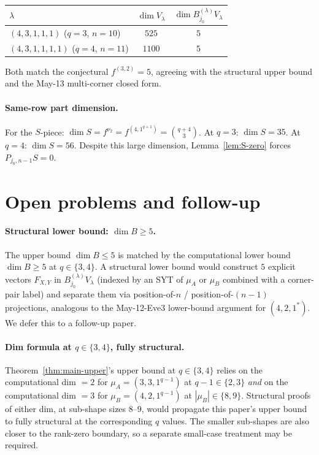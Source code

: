 \documentclass[11pt]{article}
\theoremstyle{definition}
\begin{document}
\begin{center}
\begin{tabular}{lcc}
\toprule
$\lambda$ & $\dim V_\lambda$ & $\dim B^{(\lambda)}_{j_0} V_\lambda$ \\
\midrule
$(4, 3, 1, 1, 1)$ \quad ($q = 3$, $n = 10$) & $525$ & $5$ \\
$(4, 3, 1, 1, 1, 1)$ \quad ($q = 4$, $n = 11$) & $1100$ & $5$ \\
\bottomrule
\end{tabular}
\end{center}

Both match the conjectural $f^{(3, 2)} = 5$, agreeing with the
structural upper bound and the May-13 multi-corner closed form.

\paragraph{Same-row part dimension.} For the $S$-piece:
$\dim S = f^{\nu_2} = f^{(4, 1^{q+1})} = \binom{q+4}{3}$.
At $q = 3$: $\dim S = 35$. At $q = 4$: $\dim S = 56$. Despite
this large dimension, Lemma~\ref{lem:S-zero} forces
$P_{j_0, n-1} S = 0$.

\section{Open problems and follow-up}\label{sec:open}

\paragraph{Structural lower bound: $\dim B \ge 5$.}
The upper bound $\dim B \le 5$ is matched by the computational
lower bound $\dim B \ge 5$ at $q \in \{3, 4\}$. A structural lower
bound would construct $5$ explicit vectors $F_{X, Y}$ in
$B^{(\lambda)}_{j_0} V_\lambda$ (indexed by an SYT of $\mu_A$ or
$\mu_B$ combined with a corner-pair label) and separate them via
position-of-$n$ / position-of-$(n-1)$ projections, analogous to the
May-12-Eve3 lower-bound argument for $(4, 2, 1^*)$. We defer this to
a follow-up paper.

\paragraph{Dim formula at $q \in \{3, 4\}$, fully structural.}
Theorem~\ref{thm:main-upper}'s upper bound at $q \in \{3, 4\}$ relies
on the computational dim $= 2$ for $\mu_A = (3, 3, 1^{q-1})$ at
$q - 1 \in \{2, 3\}$ \emph{and} on the computational dim $= 3$ for
$\mu_B = (4, 2, 1^{q-1})$ at $|\mu_B| \in \{8, 9\}$. Structural
proofs of either dim, at sub-shape sizes $8$--$9$, would propagate
this paper's upper bound to fully structural at the corresponding
$q$ values. The smaller sub-shapes are also closer to the rank-zero
boundary, so a separate small-case treatment may be required.
\end{document}
